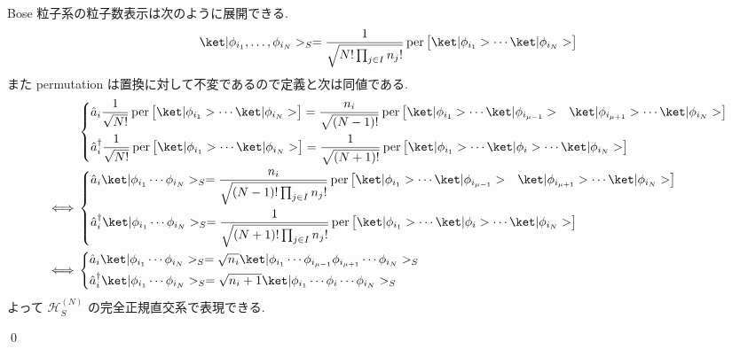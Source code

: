 \documentclass[uplatex,dvipdfmx,a4paper,11pt]{jlreq}
\makeatletter
\DeclareMathOperator{\per}{per}
\newcommand{\HH}{\mathcal{H}}
\numberwithin{equation}{section}
\theoremstyle{definition}
\renewenvironment{proof}[1][\proofname]{\par
  \normalfont
  \topsep6\p@\@plus6\p@ \trivlist
  \item[\hskip\labelsep{\bfseries #1}\@addpunct{\bfseries}]\ignorespaces\quad\par
}{
  \qed\endtrivlist\@endpefalse
}
\renewcommand\proofname{証明}
\makeatother
\begin{document}
\begin{proof}
  Bose 粒子系の粒子数表示は次のように展開できる.
  \begin{align}
    \ket|\phi_{i_1},\ldots,\phi_{i_N}>_S = \frac{1}{\sqrt{N!\prod_{j\in I}n_j!}}\per\begin{bmatrix}\ket|\phi_{i_1}>\cdots\ket|\phi_{i_N}>\end{bmatrix}
  \end{align}
  また permutation は置換に対して不変であるので定義と次は同値である.
  \begin{align}
     & \begin{dcases}
         \hat{a}_i\frac{1}{\sqrt{N!}}\per\begin{bmatrix}\ket|\phi_{i_1}> \cdots \ket|\phi_{i_N}>\end{bmatrix} = \frac{n_i}{\sqrt{(N-1)!}}\per\begin{bmatrix}\ket|\phi_{i_1}> \cdots \ket|\phi_{i_{\mu - 1}}> & \ket|\phi_{i_{\mu + 1}}> \cdots \ket|\phi_{i_N}>\end{bmatrix} \\
         \hat{a}_i^\dagger\frac{1}{\sqrt{N!}}\per\begin{bmatrix}\ket|\phi_{i_1}> \cdots \ket|\phi_{i_N}>\end{bmatrix} = \frac{1}{\sqrt{(N+1)!}}\per\begin{bmatrix}\ket|\phi_{i_1}> \cdots \ket|\phi_{i}> \cdots \ket|\phi_{i_N}>\end{bmatrix}
       \end{dcases}                      \\
    \iff
     & \begin{dcases}
         \hat{a}_i\ket|\phi_{i_1}\cdots\phi_{i_N}>_S = \frac{n_i}{\sqrt{(N-1)!\prod_{j\in I}n_j!}}\per\begin{bmatrix}\ket|\phi_{i_1}> \cdots \ket|\phi_{i_{\mu - 1}}> & \ket|\phi_{i_{\mu + 1}}> \cdots \ket|\phi_{i_N}>\end{bmatrix} \\
         \hat{a}_i^\dagger\ket|\phi_{i_1}\cdots\phi_{i_N}>_S = \frac{1}{\sqrt{(N+1)!\prod_{j\in I}n_j!}}\per\begin{bmatrix}\ket|\phi_{i_1}> \cdots \ket|\phi_i> \cdots \ket|\phi_{i_N}>\end{bmatrix}
       \end{dcases}                                                     \\
    \iff
     & \begin{dcases}
         \hat{a}_i\ket|\phi_{i_1}\cdots\phi_{i_N}>_S = \sqrt{n_i}\ket|\phi_{i_1}\cdots\phi_{i_{\mu - 1}}\phi_{i_{\mu + 1}}\cdots\phi_{i_N}>_S \\
         \hat{a}_i^\dagger\ket|\phi_{i_1}\cdots\phi_{i_N}>_S = \sqrt{n_i+1}\ket|\phi_{i_1}\cdots\phi_{i}\cdots\phi_{i_N}>_S
       \end{dcases}
  \end{align}
  よって $\HH_S^{(N)}$ の完全正規直交系で表現できる.
\end{proof}
\end{document}
